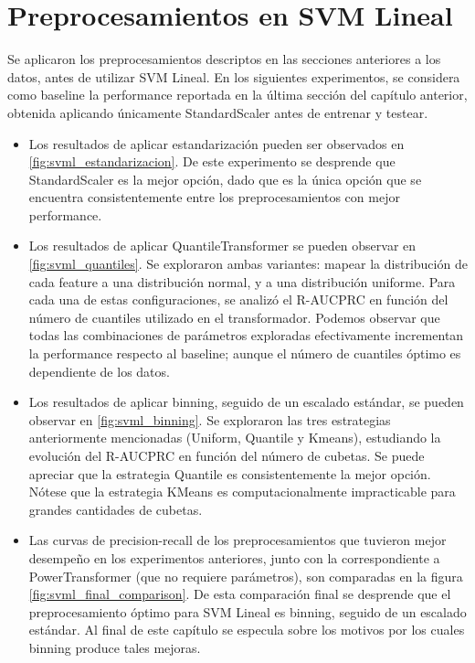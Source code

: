 \section { Preprocesamientos en SVM Lineal }

Se aplicaron los preprocesamientos descriptos en las secciones anteriores a los datos, antes de utilizar SVM Lineal. En los siguientes experimentos, se considera como baseline la performance reportada en la última sección del capítulo anterior, obtenida aplicando únicamente StandardScaler antes de entrenar y testear. 

\begin{itemize}

\item Los resultados de aplicar estandarización pueden ser observados en \ref{fig:svml_estandarizacion}. De este experimento se desprende que StandardScaler es la mejor opción, dado que es la única opción que se encuentra consistentemente entre los preprocesamientos con mejor performance.

\item Los resultados de aplicar QuantileTransformer se pueden observar en \ref{fig:svml_quantiles}. Se exploraron ambas variantes: mapear la distribución de cada feature a una distribución normal, y a una distribución uniforme. Para cada una de estas configuraciones, se analizó el R-AUCPRC en función del número de cuantiles utilizado en el transformador. Podemos observar que todas las combinaciones de parámetros exploradas efectivamente incrementan la performance respecto al baseline; aunque el número de cuantiles óptimo es dependiente de los datos.

\item Los resultados de aplicar binning, seguido de un escalado estándar, se pueden observar en \ref{fig:svml_binning}. Se exploraron las tres estrategias anteriormente mencionadas (Uniform, Quantile y Kmeans), estudiando la evolución del R-AUCPRC en función del número de cubetas. Se puede apreciar que la estrategia Quantile es consistentemente la mejor opción. Nótese que la estrategia KMeans es computacionalmente impracticable para grandes cantidades de cubetas.

\item Las curvas de precision-recall de los preprocesamientos que tuvieron mejor desempeño en los experimentos anteriores, junto con la correspondiente a PowerTransformer (que no requiere parámetros), son comparadas en la figura \ref{fig:svml_final_comparison}. De esta comparación final se desprende que el preprocesamiento óptimo para SVM Lineal es binning, seguido de un escalado estándar. Al final de este capítulo se especula sobre los motivos por los cuales binning produce tales mejoras.
\end{itemize}


